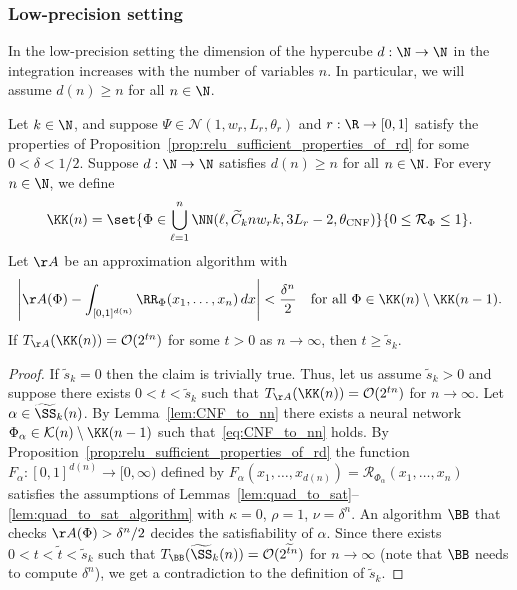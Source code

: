 \documentclass{amsart}[11pt]
\numberwithin{equation}{section}
\newcommand{\nn}{\mathcal{N}}
\newcommand{\realization}{\mathcal{R}}
\newcommand{\order}{\mathcal{O}}
\newcommand{\worstTime}{T}
\numberwithin{theorem}{section}
\begin{document}
\subsubsection{Low-precision setting}

In the low-precision setting the dimension of the hypercube $d:\N \to \N$ in the integration increases with the number of variables $n$. In particular, we will assume $d(n) \geq n$ for all $n \in \N$. 

\begin{theorem}\label{thm:hardness_hypercube2}
    Let $k\in \N$, and suppose $\Psi \in \nn(1, w_r, L_r, \theta_r)$ and $r: \R \to [0, 1]$ satisfy the properties of Proposition~\ref{prop:relu_sufficient_properties_of_rd} for some $0 < \delta < 1/2$. Suppose $d: \N \to \N$ satisfies $d(n) \geq n$ for all $n \in \N$. For every $n \in \N$, we define 
    \begin{align}
        \KK(n) =  \set{\Phi \in \bigcup_{\ell = 1}^n \NN(\ell ,\widetilde C_k n w_r k, 3L_r-2,\theta_{\rm{CNF}})}{0\leq\realization_\Phi \leq 1}.
    \end{align}
    Let $\AA$ be an approximation algorithm with 
    \begin{align*}
        \left|\AA(\Phi) - \int_{[0, 1]^{d(n)}} \RR_\Phi(x_1, \ldots, x_n) \, dx\right| < \frac{\delta^{n}}{2}\quad\text{for all }\Phi \in \KK(n)\setminus\KK(n - 1).
    \end{align*}
    If $\worstTime_{\AA}(\KK(n)) = \order(2^{tn})$ for some $t>0$ as $n \to \infty$, then $t \geq \widetilde s_k$.
\end{theorem}
\begin{proof}
    If $\widetilde s_k = 0$ then the claim is trivially true. Thus, let us assume $\widetilde s_k > 0$ and suppose there exists $0 < t < \widetilde s_k$ such that $\worstTime_{\AA}(\KK(n)) = \order(2^{tn})$ for $n \to \infty$. Let $\alpha\in \widetilde \SS_k(n)$. By Lemma~\ref{lem:CNF_to_nn} there exists a neural network $\Phi_\alpha \in \mathcal{K}(n) \setminus\KK(n - 1)$ such that~\eqref{eq:CNF_to_nn} holds. By Proposition~\ref{prop:relu_sufficient_properties_of_rd} the function $F_\alpha: [0, 1]^{d(n)} \to [0, \infty)$ defined by $F_\alpha(x_1, \ldots, x_{d(n)}) = \realization_{\Phi_\alpha}(x_1, \ldots, x_n)$ satisfies the assumptions of Lemmas~\ref{lem:quad_to_sat}--\ref{lem:quad_to_sat_algorithm} with $\kappa=0$, $\rho=1$, $\nu = \delta^n$. An algorithm $\BB$ that checks $\AA(\Phi) > \delta^{n}/2$ decides the satisfiability of $\alpha$. Since there exists $0 < t < \widetilde t < \widetilde s_k$ such that $\worstTime_{\BB}(\widetilde \SS_k(n)) = \order(2^{\widetilde t n})$ for $n \to \infty$ (note that $\BB$ needs to compute $\delta^n$), we get a contradiction to the definition of $\widetilde s_k$.
\end{proof}
\end{document}
